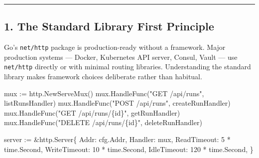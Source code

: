 \documentclass[
]{article}
\newenvironment{Shaded}{}{}
\newcommand{\DecValTok}[1]{\textcolor[rgb]{0.25,0.63,0.44}{#1}}
\newcommand{\NormalTok}[1]{#1}
\newcommand{\OperatorTok}[1]{\textcolor[rgb]{0.40,0.40,0.40}{#1}}
\newcommand{\StringTok}[1]{\textcolor[rgb]{0.25,0.44,0.63}{#1}}
\begin{document}
\begin{center}\rule{0.5\linewidth}{0.5pt}\end{center}

\hypertarget{the-standard-library-first-principle}{%
\subsection{1. The Standard Library First
Principle}\label{the-standard-library-first-principle}}

Go's \texttt{net/http} package is production-ready without a framework.
Major production systems --- Docker, Kubernetes API server, Consul,
Vault --- use \texttt{net/http} directly or with minimal routing
libraries. Understanding the standard library makes framework choices
deliberate rather than habitual.

\begin{Shaded}
\begin{Highlighting}[]
\NormalTok{mux }\OperatorTok{:=}\NormalTok{ http}\OperatorTok{.}\NormalTok{NewServeMux}\OperatorTok{()}
\NormalTok{mux}\OperatorTok{.}\NormalTok{HandleFunc}\OperatorTok{(}\StringTok{"GET /api/runs"}\OperatorTok{,}\NormalTok{ listRunsHandler}\OperatorTok{)}
\NormalTok{mux}\OperatorTok{.}\NormalTok{HandleFunc}\OperatorTok{(}\StringTok{"POST /api/runs"}\OperatorTok{,}\NormalTok{ createRunHandler}\OperatorTok{)}
\NormalTok{mux}\OperatorTok{.}\NormalTok{HandleFunc}\OperatorTok{(}\StringTok{"GET /api/runs/\{id\}"}\OperatorTok{,}\NormalTok{ getRunHandler}\OperatorTok{)}
\NormalTok{mux}\OperatorTok{.}\NormalTok{HandleFunc}\OperatorTok{(}\StringTok{"DELETE /api/runs/\{id\}"}\OperatorTok{,}\NormalTok{ deleteRunHandler}\OperatorTok{)}

\NormalTok{server }\OperatorTok{:=} \OperatorTok{\&}\NormalTok{http}\OperatorTok{.}\NormalTok{Server}\OperatorTok{\{}
\NormalTok{    Addr}\OperatorTok{:}\NormalTok{         cfg}\OperatorTok{.}\NormalTok{Addr}\OperatorTok{,}
\NormalTok{    Handler}\OperatorTok{:}\NormalTok{      mux}\OperatorTok{,}
\NormalTok{    ReadTimeout}\OperatorTok{:}  \DecValTok{5} \OperatorTok{*}\NormalTok{ time}\OperatorTok{.}\NormalTok{Second}\OperatorTok{,}
\NormalTok{    WriteTimeout}\OperatorTok{:} \DecValTok{10} \OperatorTok{*}\NormalTok{ time}\OperatorTok{.}\NormalTok{Second}\OperatorTok{,}
\NormalTok{    IdleTimeout}\OperatorTok{:}  \DecValTok{120} \OperatorTok{*}\NormalTok{ time}\OperatorTok{.}\NormalTok{Second}\OperatorTok{,}
\OperatorTok{\}}
\end{Highlighting}
\end{Shaded}
\end{document}
